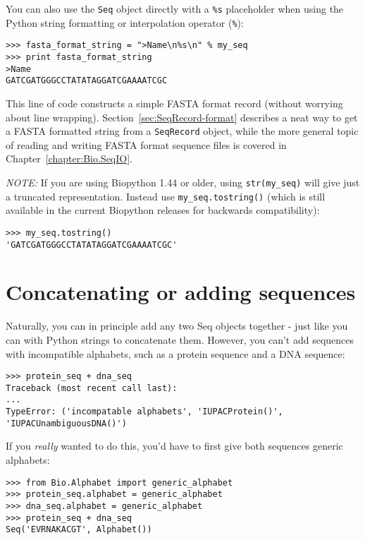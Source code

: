 \documentclass{report}
\begin{document}
You can also use the \verb|Seq| object directly with a \verb|%s| placeholder when using the Python string formatting or interpolation operator (\verb|%|):
\begin{verbatim}
>>> fasta_format_string = ">Name\n%s\n" % my_seq
>>> print fasta_format_string
>Name
GATCGATGGGCCTATATAGGATCGAAAATCGC
\end{verbatim}

\noindent This line of code constructs a simple FASTA format record (without worrying about line wrapping).
Section~\ref{sec:SeqRecord-format} describes a neat way to get a FASTA formatted
string from a \verb|SeqRecord| object, while the more general topic of reading and
writing FASTA format sequence files is covered in Chapter~\ref{chapter:Bio.SeqIO}.

\emph{NOTE:} If you are using Biopython 1.44 or older, using \verb|str(my_seq)|
will give just a truncated representation.  Instead use \verb|my_seq.tostring()|
(which is still available in the current Biopython releases for backwards compatibility):

\begin{verbatim}
>>> my_seq.tostring()
'GATCGATGGGCCTATATAGGATCGAAAATCGC'
\end{verbatim}

\section{Concatenating or adding sequences}

Naturally, you can in principle add any two Seq objects together - just like you can with Python strings to concatenate them.  However, you can't add sequences with incompatible alphabets, such as a protein sequence and a DNA sequence:

\begin{verbatim}
>>> protein_seq + dna_seq
Traceback (most recent call last):
...
TypeError: ('incompatable alphabets', 'IUPACProtein()', 'IUPACUnambiguousDNA()')
\end{verbatim}

If you \emph{really} wanted to do this, you'd have to first give both sequences generic alphabets:

\begin{verbatim}
>>> from Bio.Alphabet import generic_alphabet
>>> protein_seq.alphabet = generic_alphabet
>>> dna_seq.alphabet = generic_alphabet
>>> protein_seq + dna_seq
Seq('EVRNAKACGT', Alphabet())
\end{verbatim}
\end{document}
